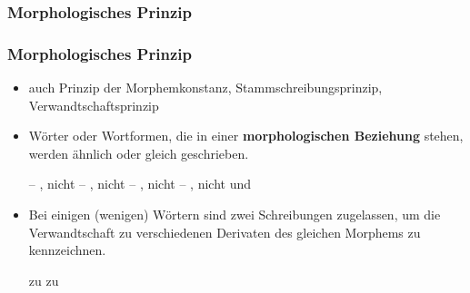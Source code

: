 \subsubsection{Morphologisches Prinzip}

\begin{frame}
\frametitle{Morphologisches Prinzip}

\begin{itemize}
	\item auch Prinzip der Morphemkonstanz, Stammschreibungsprinzip, Verwandtschaftsprinzip
	
	\item Wörter oder Wortformen, die in einer \textbf{morphologischen Beziehung} stehen, werden ähnlich oder gleich geschrieben.
	
	\eal
	\ex {} -- , nicht 
	\ex {} -- , nicht 
	\ex {} -- , nicht 
	\ex {} -- , nicht  und 
	\zl

	\item Bei einigen (wenigen) Wörtern sind zwei Schreibungen zugelassen, um die Verwandtschaft zu verschiedenen Derivaten des gleichen Morphems zu kennzeichnen.
	
	\ea 
	\ea {} zu 
	\ex {} zu 
	\z
	\z 
\end{itemize}

\end{frame}



